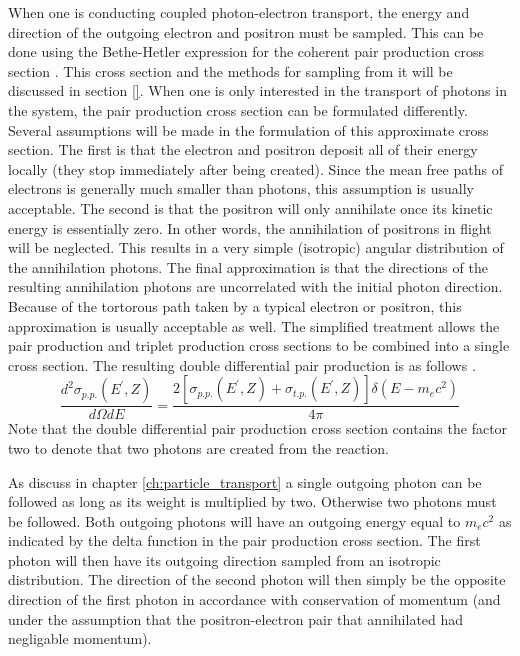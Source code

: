 When one is conducting coupled photon-electron transport, the energy and 
direction of the outgoing electron and positron must be sampled. This can
be done using the Bethe-Hetler expression for the coherent pair production
cross section \citep{mukhin_experimental_1987, salvat_physics_2001}. This
cross section and the methods for sampling from it will be discussed in 
section \ref{}. When one is only interested in the transport of photons in 
the system, the pair production cross section can be formulated differently. 
Several assumptions will be made in the formulation of this approximate
cross section. The first is that the electron and positron deposit all of 
their energy locally (they stop immediately after being created). Since the 
mean free paths of electrons is generally much smaller than photons, this
assumption is usually acceptable. The second is that the positron will only
annihilate once its kinetic energy is essentially zero. In other words, the
annihilation of positrons in flight will be neglected. This results in a very
simple (isotropic) angular distribution of the annihilation photons. The final 
approximation is that the directions of the resulting annihilation photons are 
uncorrelated with the initial photon direction. Because of the tortorous path 
taken by a typical electron or positron, this approximation is usually 
acceptable as well. The simplified treatment allows the pair production and 
triplet production cross sections to be combined into a single cross section. 
The resulting double differential pair production is as follows 
\citep{gabler_amos_2006}.
\begin{equation}
  \frac{d^2\sigma_{p.p.}(E^{'},Z)}{d\Omega dE} = \frac{2 [\sigma_{p.p.}(E^{'},Z) 
    + \sigma_{t.p.}(E^{'},Z)] \delta(E - m_ec^2)}{4\pi}
\end{equation}
Note that the double differential pair production cross section contains the 
factor two to denote that two photons are created from the reaction. 

As discuss in chapter \ref{ch:particle_transport} a single outgoing photon can
be followed as long as its weight is multiplied by two. Otherwise two photons
must be followed. Both outgoing photons will have an outgoing energy equal to
$m_ec^2$ as indicated by the delta function in the pair production cross 
section. The first photon will then have its outgoing direction sampled from
an isotropic distribution. The direction of the second photon will then simply
be the opposite direction of the first photon in accordance with conservation
of momentum (and under the assumption that the positron-electron pair that
annihilated had negligable momentum).

